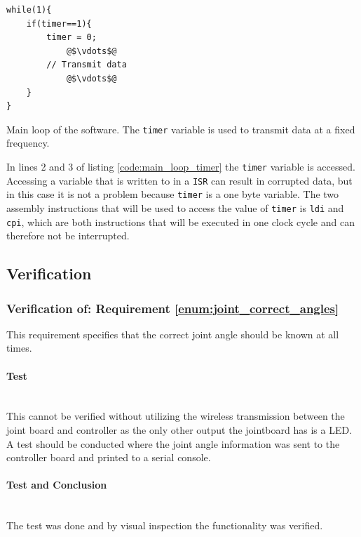 {\begin{listing}[H] 
\begin{verbatim}
while(1){
    if(timer==1){ 
      	timer = 0;
      		@$\vdots$@
      	// Transmit data
			@$\vdots$@      
	}
}
\end{verbatim}
\caption{Main loop of the software. The \texttt{timer} variable is used to transmit data at a fixed frequency.} 
\label{code:main_loop_timer}
\end{listing}
In lines 2 and 3 of listing \ref{code:main_loop_timer} the \texttt{timer} variable is accessed.  
Accessing a variable that is written to in a \texttt{ISR} can result in corrupted data, but in this case it is not a problem because \texttt{timer} is a one byte variable. 
The two assembly instructions that will be used to access the value of \texttt{timer} is \texttt{ldi} and \texttt{cpi}, which are both instructions that will be executed in one clock cycle and can therefore not be interrupted.

\subsection{Verification} %
\label{sub:verification}

\subsubsection{Verification of: Requirement \ref{enum:joint_correct_angles}} %
\label{ssub:requirement_enum:correct_angles}
This requirement specifies that the correct joint angle should be known at all times.

\paragraph{Test}~\\
This cannot be verified without utilizing the wireless transmission between the joint board and controller as the only other output the jointboard has is a LED.
A test should be conducted where the joint angle information was sent to the controller board and printed to a serial console.

\paragraph{Test and Conclusion}~\\
The test was done and by visual inspection the functionality was verified.

}
